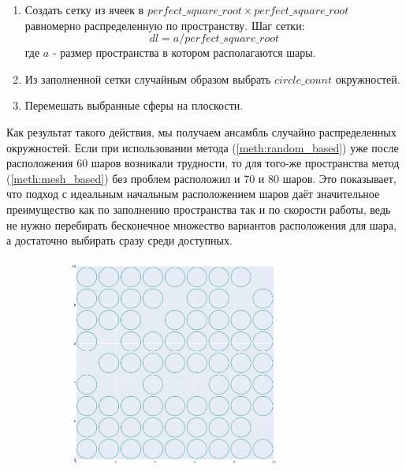 \begin{enumerate}
\begin{enumerate}[label=\arabic*)]
        \item 
        Создать сетку из ячеек в $perfect\_square\_root \times perfect\_square\_root$ равномерно распределенную по пространству. Шаг сетки: 
        $$
        dl=a/perfect\_square\_root
        $$ 
        где $a$ - размер пространства в котором располагаются шары.
        \item
        Из заполненной сетки случайным образом выбрать $circle\_count$ окружностей.
        \item
        Перемешать выбранные сферы на плоскости.
    \end{enumerate}
    Как результат такого действия, мы получаем ансамбль случайно распределенных окружностей. Если при использовании метода (\ref{meth:random_based}) уже после расположения 60 шаров возникали трудности, то для того-же пространства метод (\ref{meth:mesh_based}) без проблем расположил и 70 и 80 шаров. Это показывает, что подход с идеальным начальным расположением шаров даёт значительное преимущество как по заполнению пространства так и по скорости работы, ведь не нужно перебирать бесконечное множество вариантов расположения для шара, а достаточно выбирать сразу среди доступных.
    \renewcommand{\imgsize}{7cm}
    \begin{figure}[h!]
        \begin{subfigure}{0.49\textwidth}
            \centering
            \includegraphics [width=\imgsize,height=\imgsize]{figures/mesh_based/70_before_shuffeling.png}

\end{subfigure}
\end{figure}
\end{enumerate}

